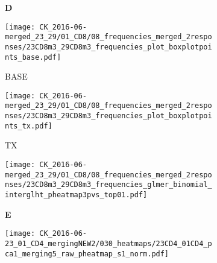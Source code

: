 \documentclass[a4paper, 12pt]{article}
\begin{document}
\begin{figure}[!thb]
\centering

    \caption{Frequencies CD8}
    \begin{subfigure}[t]{0.02\textwidth}
    \vskip 0pt
        \textbf{\textsf{\normalsize D}}
    \end{subfigure}
    \begin{subfigure}[t]{0.45\textwidth}
    \vskip 0pt
    \caption{BASE}
        \texttt{[image: CK\_2016-06-merged\_23\_29/01\_CD8/08\_frequencies\_merged\_2responses/23CD8m3\_29CD8m3\_frequencies\_plot\_boxplotpoints\_base.pdf]}
    \end{subfigure}
    \quad
        \begin{subfigure}[t]{0.02\textwidth}
    \vskip 0pt
        \textbf{\textsf{\normalsize }}
    \end{subfigure}
    \begin{subfigure}[t]{0.45\textwidth}
    \vskip 0pt
    \caption{TX}
        \texttt{[image: CK\_2016-06-merged\_23\_29/01\_CD8/08\_frequencies\_merged\_2responses/23CD8m3\_29CD8m3\_frequencies\_plot\_boxplotpoints\_tx.pdf]}
    \end{subfigure}

    \begin{subfigure}[t]{0.02\textwidth}
    \vskip 0pt
        \textbf{\textsf{\normalsize }}
    \end{subfigure}
    \begin{subfigure}[t]{0.5\textwidth}
    \vskip 0pt
    \caption{}
        \texttt{[image: CK\_2016-06-merged\_23\_29/01\_CD8/08\_frequencies\_merged\_2responses/23CD8m3\_29CD8m3\_frequencies\_glmer\_binomial\_interglht\_pheatmap3pvs\_top01.pdf]}
    \end{subfigure}


\end{figure}


\begin{figure}[!thb]
\centering

    \caption{Heatmap - data 23 CD4}
    \begin{subfigure}[t]{0.02\textwidth}
    \vskip 0pt
        \textbf{\textsf{\normalsize E}}
    \end{subfigure}
    \begin{subfigure}[t]{0.97\textwidth}
    \vskip 0pt
    \caption{}
        \texttt{[image: CK\_2016-06-23\_01\_CD4\_mergingNEW2/030\_heatmaps/23CD4\_01CD4\_pca1\_merging5\_raw\_pheatmap\_s1\_norm.pdf]}
    \end{subfigure}
    
\end{figure}
\end{document}
